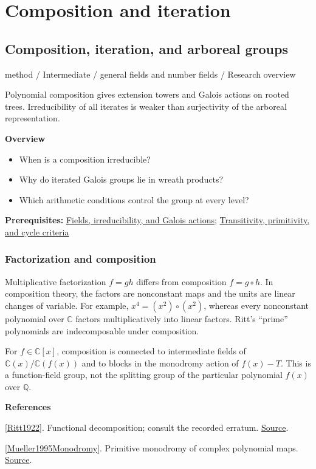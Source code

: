 \documentclass[11pt,a4paper,oneside,openany]{book}
\newenvironment{sources}{\par\smallskip\begingroup\footnotesize\color{atlasgray}\leftskip=10pt\setlength{\parskip}{2pt}}{\par\endgroup\smallskip}
\begin{document}
\part{Composition and iteration}
\chapter{Composition, iteration, and arboreal groups}\label{article:composition-iteration}\hypertarget{article:composition-iteration}{}\color{black}
{\sffamily\small\color{atlasgold}method / Intermediate / general fields and number fields / Research overview}\par\medskip
Polynomial composition gives extension towers and Galois actions on rooted trees. Irreducibility of all iterates is weaker than surjectivity of the arboreal representation.\par\medskip
\textbf{Overview}\begin{itemize}
\item When is a composition irreducible?
\item Why do iterated Galois groups lie in wreath products?
\item Which arithmetic conditions control the group at every level?
\end{itemize}
{\small\textbf{Prerequisites:} \hyperlink{article:foundations}{Fields, irreducibility, and Galois actions}; \hyperlink{article:permutation-groups}{Transitivity, primitivity, and cycle criteria}}\par
{}\section{Factorization and composition}
\color{black} Multiplicative factorization \(f=gh\) differs from composition \(f=g\circ h\). In composition theory, the factors are nonconstant maps and the units are linear changes of variable. For example, \(x^4=(x^2)\circ(x^2)\), whereas every nonconstant polynomial over \(\mathbb C\) factors multiplicatively into linear factors. Ritt's ``prime'' polynomials are indecomposable under composition.\par
\color{black} For \(f\in\mathbb C[x]\), composition is connected to intermediate fields of \(\mathbb C(x)/\mathbb C(f(x))\) and to blocks in the monodromy action of \(f(x)-T\). This is a function-field group, not the splitting group of the particular polynomial \(f(x)\) over \(\mathbb Q\).\par
\begin{sources}
\textbf{References}\par\smallskip
\noindent\hyperlink{ref:Ritt1922}{[Ritt1922]}. Functional decomposition; consult the recorded erratum. \href{https://www.jstor.org/stable/1988911}{Source}.\par
\noindent\hyperlink{ref:Mueller1995Monodromy}{[Mueller1995Monodromy]}. Primitive monodromy of complex polynomial maps. \href{https://ypfmde.github.io/Papers/mon.pdf}{Source}.\par
\end{sources}\color{black}
\end{document}
